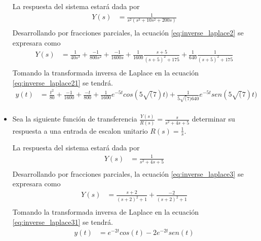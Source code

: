 \documentclass[12pt]{article}
\begin{document}
\begin{itemize}
    La respuesta del sistema estará dada por 
    \begin{equation}
        \begin{split}
            Y(s)&=\frac{1}{s^2(s^3+10s^2+200s)}\\
            \label{eq:inverse_laplace2}
        \end{split}
    \end{equation}
    Desarrollando por fracciones parciales, la ecuación \ref{eq:inverse_laplace2} se expresara como
    \begin{equation}
        \begin{split}
            Y(s)&=\frac{1}{40s^3}+\frac{-1}{800s^2}+\frac{-1}{1600s}+\frac{1}{1600}\frac{s+5}{(s+5)^2+175}+\frac{1}{640}\frac{1}{(s+5)^2+175}\\
            \label{eq:inverse_laplace21}
        \end{split}
    \end{equation}
    Tomando la transformada inversa de Laplace en la ecuación \ref{eq:inverse_laplace21} se tendrá.
    \begin{equation}
        \begin{split}
            y(t)&=\frac{t^2}{80}+\frac{-1}{1600}+\frac{-t}{800}+\frac{1}{1600}e^{-5t}cos(5\sqrt(7)t)+\frac{1}{5\sqrt(7)640}e^{-5t}sen(5\sqrt(7)t)\\
            \label{eq:inverse_laplace22}
        \end{split}
    \end{equation}

    \item Sea la siguiente función de transferencia $\frac{Y(s)}{R(s)}=\frac{s}{s^2+4s+5}$ determinar su respuesta a una entrada de escalon unitario $R(s)=\frac{1}{s}$.
    
    La respuesta del sistema estará dada por 
    \begin{equation}
        \begin{split}
            Y(s)&=\frac{1}{s^2+4s+5}\\
            \label{eq:inverse_laplace3}
        \end{split}
    \end{equation}
    Desarrollando por fracciones parciales, la ecuación \ref{eq:inverse_laplace3} se expresara como
    \begin{equation}
        \begin{split}
            Y(s)&=\frac{s+2}{(s+2)^2+1}+\frac{-2}{(s+2)^2+1}\\
            \label{eq:inverse_laplace31}
        \end{split}
    \end{equation}
    Tomando la transformada inversa de Laplace en la ecuación \ref{eq:inverse_laplace31} se tendrá.
    \begin{equation}
        \begin{split}
            y(t)&=e^{-2t}cos(t)-2e^{-2t}sen(t)\\
            \label{eq:inverse_laplace32}
        \end{split}
    \end{equation}


\end{itemize}
\end{document}
